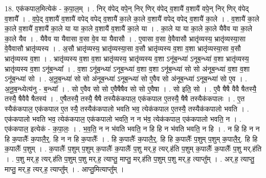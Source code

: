 \documentclass[17pt]{extarticle}
\begin{document}
18. एक॑कपाल॒मित्येक॑ - क॒पा॒ल॒म् । . निर् व॑पेद् वपे॒न् निर् णिर् व॑पेद् व॒शायै॑ व॒शायै॑ वपे॒न् निर् णिर् व॑पेद् व॒शायै᳚ । . व॒पे॒द् व॒शायै॑ व॒शायै॑ वपेद् वपेद् व॒शायै॑ का॒ले का॒ले व॒शायै॑ वपेद् वपेद् व॒शायै॑ का॒ले । . व॒शायै॑ का॒ले का॒ले व॒शायै॑ व॒शायै॑ का॒ले या या का॒ले व॒शायै॑ व॒शायै॑ का॒ले या । . का॒ले या या का॒ले का॒ले यैवैव या का॒ले का॒ले यैव । . यैवैव या यैवासा व॒सा वे॒व या यैवासौ । . ए॒वासा व॒सा वे॒वैवासौ भ्रातृ॑व्यस्य॒ भ्रातृ॑व्यस्या॒सा वे॒वैवासौ भ्रातृ॑व्यस्य । . अ॒सौ भ्रातृ॑व्यस्य॒ भ्रातृ॑व्यस्या॒सा व॒सौ भ्रातृ॑व्यस्य व॒शा व॒शा भ्रातृ॑व्यस्या॒सा व॒सौ भ्रातृ॑व्यस्य व॒शा । . भ्रातृ॑व्यस्य व॒शा व॒शा भ्रातृ॑व्यस्य॒ भ्रातृ॑व्यस्य व॒शा ऽनू॑ब॒न्ध्या॑ ऽनूब॒न्ध्या॑ व॒शा भ्रातृ॑व्यस्य॒ भ्रातृ॑व्यस्य व॒शा ऽनू॑ब॒न्ध्या᳚ । . व॒शा ऽनू॑ब॒न्ध्या॑ ऽनूब॒न्ध्या॑ व॒शा व॒शा ऽनू॑ब॒न्ध्या॑ सो सो अ॑नूब॒न्ध्या॑ व॒शा व॒शा ऽनू॑ब॒न्ध्या॑ सो । . अ॒नू॒ब॒न्ध्या॑ सो सो अ॑नूब॒न्ध्या॑ ऽनूब॒न्ध्या॑ सो ए॒वैव सो अ॑नूब॒न्ध्या॑ ऽनूब॒न्ध्या॑ सो ए॒व । . अ॒नू॒ब॒न्ध्येत्य॑नु - ब॒न्ध्या᳚ । . सो ए॒वैव सो सो ए॒वैषैषैव सो सो ए॒वैषा । . सो इति॒ सो । . ए॒वै षैषै वैवै षैतस्यै॒ तस्यै॒ षैवैवै षैतस्य॑ । . ए॒षैतस्यै॒ तस्यै॒ षैषै तस्यैक॑कपाल॒ एक॑कपाल ए॒तस्यै॒ षैषै तस्यैक॑कपालः । . ए॒त स्यैक॑कपाल॒ एक॑कपाल ए॒त स्यै॒ तस्यैक॑कपालो भवति भव॒ त्येक॑कपाल ए॒तस्यै॒ तस्यैक॑कपालो भवति । . एक॑कपालो भवति भव॒ त्येक॑कपाल॒ एक॑कपालो भवति॒ न न भ॑व॒ त्येक॑कपाल॒ एक॑कपालो भवति॒ न । . एक॑कपाल॒ इत्येक॑ - क॒पा॒लः॒ । . भ॒व॒ति॒ न न भ॑वति भवति॒ न हि हि न भ॑वति भवति॒ न हि । . न हि हि न न हि क॒पालैः᳚ क॒पालै॒र्॒. हि न न हि क॒पालैः᳚ । . हि क॒पालैः᳚ क॒पालै॒र्॒. हि हि क॒पालैः᳚ प॒शुम् प॒शुम् क॒पालै॒र्॒. हि हि क॒पालैः᳚ प॒शुम् । . क॒पालैः᳚ प॒शुम् प॒शुम् क॒पालैः᳚ क॒पालैः᳚ प॒शु मर्.ह॒ त्यर्.ह॑ति प॒शुम् क॒पालैः᳚ क॒पालैः᳚ प॒शु मर्.ह॑ति । . प॒शु मर्.ह॒ त्यर्.ह॑ति प॒शुम् प॒शु मर्.ह॒ त्याप्तु॒ माप्तु॒ मर्.ह॑ति प॒शुम् प॒शु मर्.ह॒ त्याप्तु᳚म् । . अर्.ह॒ त्याप्तु॒ माप्तु॒ मर्.ह॒ त्यर्.ह॒ त्याप्तु᳚म् । . आप्तु॒मित्याप्तु᳚म् । \newline
\pagebreak
{}
\end{document}
